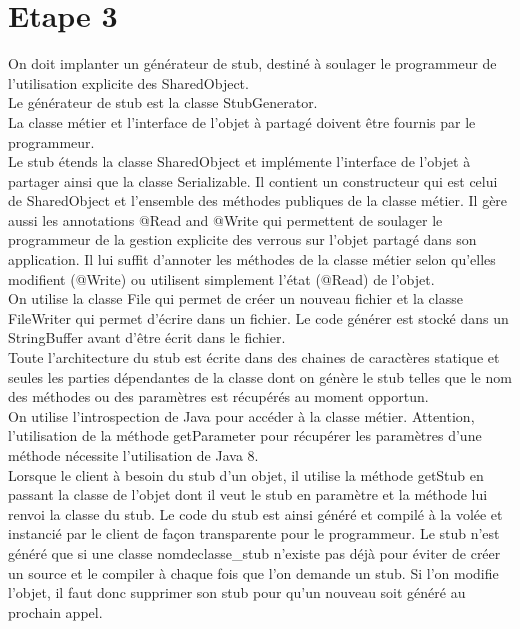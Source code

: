 \documentclass[a4paper,12pt]{article}
\begin{document}
\clearpage
\section{Etape 3}

\bigskip
\bigskip

On doit  implanter un générateur de stub, destiné à soulager le programmeur de l'utilisation explicite des SharedObject. \\

Le générateur de stub est la classe StubGenerator.\\
La classe métier et l'interface de l'objet à partagé doivent être fournis par le programmeur.\\

Le stub étends la classe SharedObject et implémente l'interface de l'objet à partager ainsi que la classe Serializable.
Il contient un constructeur qui est celui de SharedObject et l'ensemble des méthodes publiques de la classe métier.
Il gère aussi les annotations @Read and @Write qui permettent de soulager le programmeur de la gestion explicite des verrous sur l'objet partagé dans son application. Il lui suffit d'annoter les méthodes de la classe métier selon qu'elles modifient (@Write) ou utilisent simplement l'état (@Read) de l'objet. \\

On utilise la classe File qui permet de créer un nouveau fichier et la classe FileWriter qui permet d'écrire dans un fichier. Le code générer est stocké dans un StringBuffer avant d'être écrit dans le fichier.\\
Toute l'architecture du stub est écrite dans des chaines de caractères statique et seules les parties dépendantes de la classe dont on génère le stub telles que le nom des méthodes ou des paramètres est récupérés au moment opportun.\\
 On utilise l'introspection de Java pour accéder à la classe métier. Attention, l'utilisation de la méthode getParameter pour récupérer les paramètres d'une méthode nécessite l'utilisation de Java 8.\\

Lorsque le client à besoin du stub d'un objet, il utilise la méthode getStub en passant la classe de l'objet dont il veut le stub en paramètre et la méthode lui renvoi la classe du stub. Le code du stub est ainsi généré et compilé à la volée et instancié par le client de façon transparente pour le programmeur. Le stub n'est généré que si une classe nomdeclasse\_stub n'existe pas déjà pour éviter de créer un source et le compiler à chaque fois que l'on demande un stub. Si l'on modifie l'objet, il faut donc supprimer son stub pour qu'un nouveau soit généré au prochain appel.\\
\end{document}
